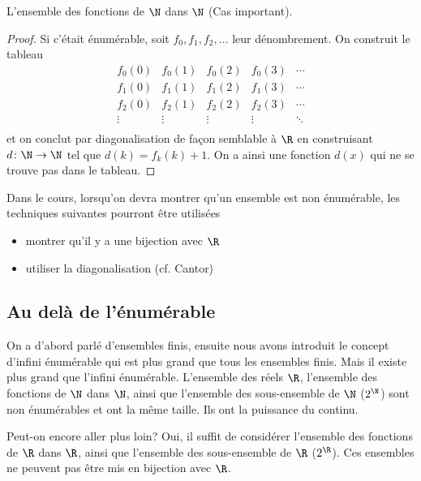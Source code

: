 \begin{myexem}
  \label{exem:fNN}
 L'ensemble des fonctions de $\N$ dans $\N$ (Cas important).
 \begin{proof}
   Si c'était énumérable, soit $f_0, f_1, f_2, \ldots$ leur dénombrement.
   On construit le tableau
   \[
     \begin{array}{ccccc}
       f_0(0) & f_0(1) & f_0(2) & f_0(3) & \cdots\\
       f_1(0) & f_1(1) & f_1(2) & f_1(3) & \cdots\\
       f_2(0) & f_2(1) & f_2(2) & f_2(3) & \cdots\\
       \vdots & \vdots & \vdots & \vdots & \ddots\\
     \end{array}
   \]
   et on conclut par diagonalisation de façon semblable à $\R$
   en construisant $d\colon \N \to \N$ tel que $d(k) = f_k(k)+1$.
   On a ainsi une fonction $d(x)$ qui ne se trouve pas dans le tableau.
 \end{proof}
\end{myexem}

Dans le cours, lorsqu'on devra montrer qu'un ensemble est non énumérable,
les techniques suivantes pourront être utilisées
\begin{itemize}
	\item montrer qu'il y a une bijection avec  $\R$
	\item utiliser la diagonalisation (cf. Cantor)
\end{itemize}


\subsection{Au delà de l'énumérable}
\label{subsec:au_dela_de_l_enumerable}
On a d'abord parlé d'ensembles finis, ensuite nous avons introduit le concept d'infini 
énumérable qui est plus grand que tous les ensembles finis. Mais il existe plus grand 
que l'infini énumérable.   L'ensemble des réels $\R$, l'ensemble des fonctions de $\N$ dans $\N$, ainsi que 
l'ensemble des sous-ensemble de $\N$ ($2^{\N}$) sont non énumérables et ont la même taille.  Ils ont la puissance du continu. 

Peut-on encore aller plus loin?  Oui,  il suffit de considérer  l'ensemble des fonctions de $\R$ dans $\R$, ainsi que 
l'ensemble des sous-ensemble de $\R$ ($2^{\R}$).  Ces ensembles ne peuvent pas être mis en bijection avec $\R$.


